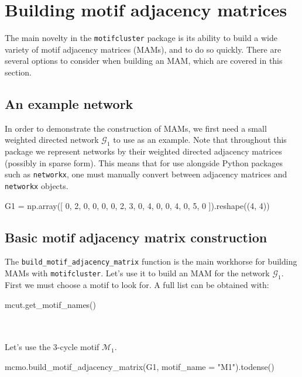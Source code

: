 \documentclass{article}
\begin{document}
\section{Building motif adjacency matrices}

The main novelty in the \texttt{motifcluster} package is its ability to
build a wide variety of motif adjacency matrices (MAMs), and to do so quickly.
There are several options to consider when building an MAM,
which are covered in this section.

\subsection{An example network}

In order to demonstrate the construction of MAMs,
we first need a small weighted directed network
$\mathcal{G}_1$ to use as an example.
Note that throughout this package we represent networks by their
weighted directed adjacency matrices (possibly in sparse form).
This means that for use alongside Python packages such as \texttt{networkx},
one must manually convert between adjacency matrices and
\texttt{networkx} objects.

\begin{pyconsole}
G1 = np.array([
  0, 2, 0, 0,
  0, 0, 2, 3,
  0, 4, 0, 0,
  4, 0, 5, 0
]).reshape((4, 4))
\end{pyconsole}

\subsection{Basic motif adjacency matrix construction}

The \texttt{build\_motif\_adjacency\_matrix} function is the main workhorse
for building MAMs with \texttt{motifcluster}.
Let's use it to build an MAM for the network $\mathcal{G}_1$.
First we must choose a motif to look for.
A full list can be obtained with:

\begin{pyverbatim}
mcut.get_motif_names()
\end{pyverbatim}
%
\vspace*{-2mm}
 \\
 \\

Let's use the 3-cycle motif $\mathcal{M}_1$.

\begin{pyconsole}
mcmo.build_motif_adjacency_matrix(G1, motif_name = "M1").todense()
\end{pyconsole}
\end{document}
